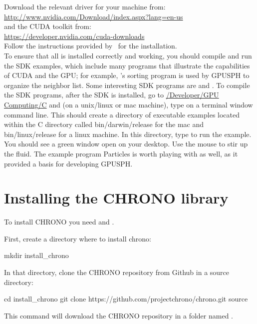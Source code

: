 Download the relevant driver for your machine from:\\
\url{http://www.nvidia.com/Download/index.aspx?lang=en-us} \\
and the CUDA toolkit from:\\
\url{https://developer.nvidia.com/cuda-downloads}\\
Follow the instructions provided by \nvidia\ for the installation.\\


To ensure that all is installed correctly and working, you should
compile and run the SDK examples, which include many programs that
illustrate the capabilities of CUDA and the GPU; for example, \nvidia's
sorting program  is used by GPUSPH to organize the
neighbor list. Some interesting SDK programs are  and
. To compile the SDK programs, after the SDK is
installed, go to \url{/Developer/GPU Computing/C} and (on a unix/linux
or mac machine), type  on a terminal window command line. This
should create a directory of executable examples located within the C
directory called bin/darwin/release for the mac and bin/linux/release
for a linux machine. In this directory, type  to run
the  example. You should see a green window open on your
desktop. Use the mouse to stir up the fluid. The example program
Particles is worth playing with as well, as it provided a basis for
developing GPUSPH.\\



\section{Installing the CHRONO library}

To install CHRONO you need  and .

First, create a directory where to install chrono:
\begin{shellcode}
mkdir install_chrono 
\end{shellcode}
In that directory, clone the CHRONO repository from Github in a source directory:
\begin{shellcode}
cd install_chrono 
git clone https://github.com/projectchrono/chrono.git source
\end{shellcode}
This command will download the CHRONO repository in a folder named .

